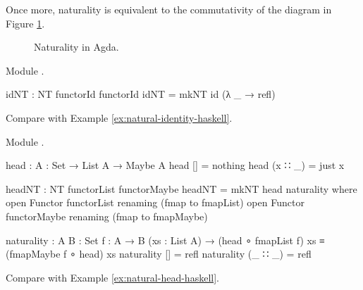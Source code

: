 Once more, naturality is equivalent to the commutativity of the
diagram in Figure \ref{fig:naturality-agda}.
\begin{figure}[htb]
  \begin{center}
  \end{center}
  \caption{Naturality in Agda.}
  \label{fig:naturality-agda}
\end{figure}

\begin{example}
  [Identity]

  Module .
  \begin{codeagda}
    idNT : NT functorId functorId
    idNT = mkNT id (λ _ → refl)
  \end{codeagda}

  Compare with Example \ref{ex:natural-identity-haskell}.

\end{example}

\begin{example}
  \label{ex:natural-head-agda}

  Module .

  \begin{codeagda}
    head : {A : Set} → List A → Maybe A
    head []      = nothing
    head (x ∷ _) = just x
  \end{codeagda}
  \begin{codeagda}
    headNT : NT functorList functorMaybe
    headNT = mkNT head naturality
      where
        open Functor functorList renaming (fmap to fmapList)
        open Functor functorMaybe renaming (fmap to fmapMaybe)

        naturality : {A B : Set} {f : A → B} (xs : List A) →
                     (head ∘ fmapList f) xs ≡ (fmapMaybe f ∘ head) xs
        naturality []      = refl
        naturality (_ ∷ _) = refl
  \end{codeagda}

  Compare with Example \ref{ex:natural-head-haskell}.

\end{example}

